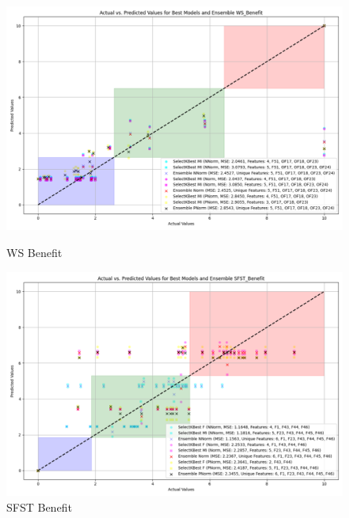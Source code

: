 \begin{figure}[H]
    \centering
    \begin{minipage}{0.45\textwidth}
        \centering
        \includegraphics[width=\linewidth]{reg_section_all/featred_ensemble_learning/actual_vs_predicted_best_feature_selection_and_ensemble_WS_Benefit_10.png}
        \caption{WS Benefit}
        \label{reg_all_fig:ws_ben_featred}
    \end{minipage}\hfill
    \begin{minipage}{0.45\textwidth}
        \centering
        \includegraphics[width=\linewidth]{reg_section_all/featred_ensemble_learning/actual_vs_predicted_best_feature_selection_and_ensemble_SFST_Benefit_10.png}
        \caption{SFST Benefit}
        \label{reg_all_fig:sfst_ben_featred}
    \end{minipage}
\end{figure}
